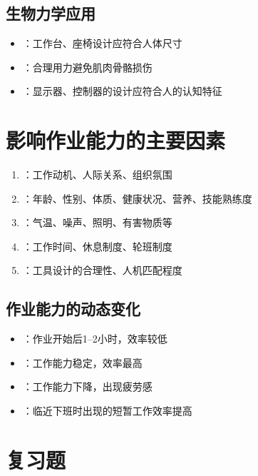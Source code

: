 \subsection{生物力学应用}

\begin{itemize}[leftmargin=*]
    \item {}：工作台、座椅设计应符合人体尺寸
    \item {}：合理用力避免肌肉骨骼损伤
    \item {}：显示器、控制器的设计应符合人的认知特征
\end{itemize}

\section{影响作业能力的主要因素}

\begin{enumerate}[leftmargin=*]
    \item {}：工作动机、人际关系、组织氛围
    \item {}：年龄、性别、体质、健康状况、营养、技能熟练度
    \item {}：气温、噪声、照明、有害物质等
    \item {}：工作时间、休息制度、轮班制度
    \item {}：工具设计的合理性、人机匹配程度
\end{enumerate}

\subsection{作业能力的动态变化}

\begin{itemize}[leftmargin=*]
    \item {}：作业开始后1--2小时，效率较低
    \item {}：工作能力稳定，效率最高
    \item {}：工作能力下降，出现疲劳感
    \item {}：临近下班时出现的短暂工作效率提高
\end{itemize}

\section{复习题}

